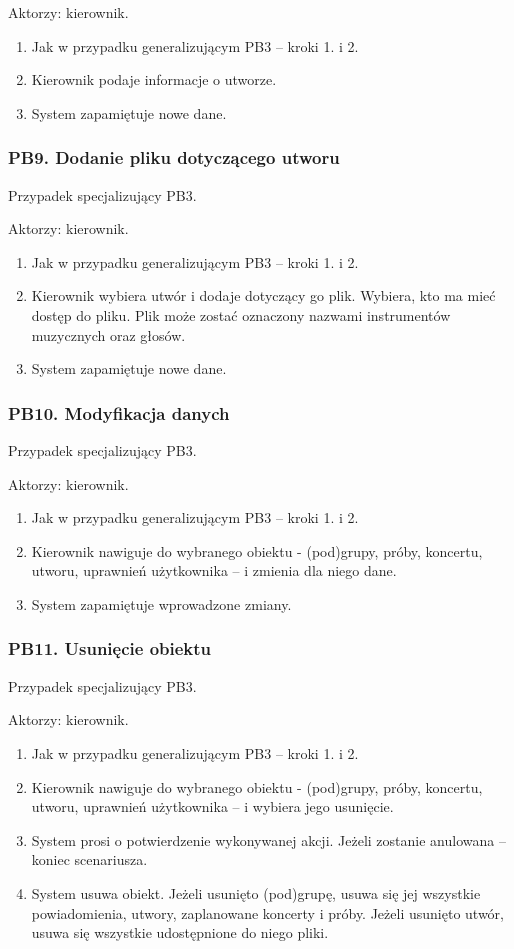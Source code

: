\documentclass[11pt,a4paper]{article}
\renewcommand{\_}{\char`_}
\begin{document}
Aktorzy: kierownik.
\begin{enumerate}
    \item Jak w przypadku generalizującym PB3 – kroki 1. i 2.
    \item Kierownik podaje informacje o utworze.
    \item System zapamiętuje nowe dane.
\end{enumerate}

\subsubsection{PB9. Dodanie pliku dotyczącego utworu}

Przypadek specjalizujący PB3.

Aktorzy: kierownik.
\begin{enumerate}
    \item Jak w przypadku generalizującym PB3 – kroki 1. i 2.
    \item Kierownik wybiera utwór i dodaje dotyczący go plik. Wybiera, kto ma mieć dostęp do pliku. Plik może zostać oznaczony nazwami instrumentów muzycznych oraz głosów.
    \item System zapamiętuje nowe dane.
\end{enumerate}

\subsubsection{PB10. Modyfikacja danych}

Przypadek specjalizujący PB3.

Aktorzy: kierownik.
\begin{enumerate}
    \item Jak w przypadku generalizującym PB3 – kroki 1. i 2.
    \item Kierownik nawiguje do wybranego obiektu - (pod)grupy, próby, koncertu, utworu, uprawnień użytkownika – i zmienia dla niego dane.
    \item System zapamiętuje wprowadzone zmiany.
\end{enumerate}

\subsubsection{PB11. Usunięcie obiektu}

Przypadek specjalizujący PB3.

Aktorzy: kierownik.
\begin{enumerate}
    \item Jak w przypadku generalizującym PB3 – kroki 1. i 2.
    \item Kierownik nawiguje do wybranego obiektu - (pod)grupy, próby, koncertu, utworu, uprawnień użytkownika – i wybiera jego usunięcie.
    \item System prosi o potwierdzenie wykonywanej akcji. Jeżeli zostanie anulowana – koniec scenariusza.
    \item System usuwa obiekt. Jeżeli usunięto (pod)grupę, usuwa się jej wszystkie powiadomienia, utwory, zaplanowane koncerty i próby. Jeżeli usunięto utwór, usuwa się wszystkie udostępnione do niego pliki.
\end{enumerate}
\end{document}
